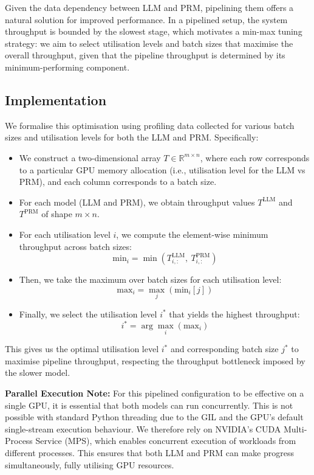 \documentclass[11pt,twoside]{report}
\begin{document}
Given the data dependency between LLM and PRM, pipelining them offers a natural solution for improved performance. 
In a pipelined setup, the system throughput is bounded by the slowest stage, which motivates a min-max tuning strategy: we aim to select utilisation levels and batch sizes that maximise the overall throughput, given that the pipeline throughput is determined by its minimum-performing component.

\subsection{Implementation}
We formalise this optimisation using profiling data collected for various batch sizes and utilisation levels for both the LLM and PRM. Specifically:
\begin{itemize}
  \item We construct a two-dimensional array \( T \in \mathbb{R}^{m \times n} \), where each row corresponds to a particular GPU memory allocation (i.e., utilisation level for the LLM vs PRM), and each column corresponds to a batch size.
  \item For each model (LLM and PRM), we obtain throughput values \( T^{\text{LLM}} \) and \( T^{\text{PRM}} \) of shape \( m \times n \).
  \item For each utilisation level \( i \), we compute the element-wise minimum throughput across batch sizes:
    \[
      \text{min}_i = \min \left( T^{\text{LLM}}_{i, :},\ T^{\text{PRM}}_{i, :} \right)
    \]
  \item Then, we take the maximum over batch sizes for each utilisation level:
    \[
      \text{max}_i = \max_j \left( \text{min}_i[j] \right)
    \]
  \item Finally, we select the utilisation level \( i^* \) that yields the highest throughput:
    \[
      i^* = \arg\max_i \left( \text{max}_i \right)
    \]
\end{itemize}

This gives us the optimal utilisation level \( i^* \) and corresponding batch size \( j^* \) to maximise pipeline throughput, respecting the throughput bottleneck imposed by the slower model.

\textbf{Parallel Execution Note:} For this pipelined configuration to be effective on a single GPU, it is essential that both models can run concurrently. This is not possible with standard Python threading due to the GIL and the GPU’s default single-stream execution behaviour. We therefore rely on NVIDIA’s CUDA Multi-Process Service (MPS), which enables concurrent execution of workloads from different processes. This ensures that both LLM and PRM can make progress simultaneously, fully utilising GPU resources.
\end{document}

